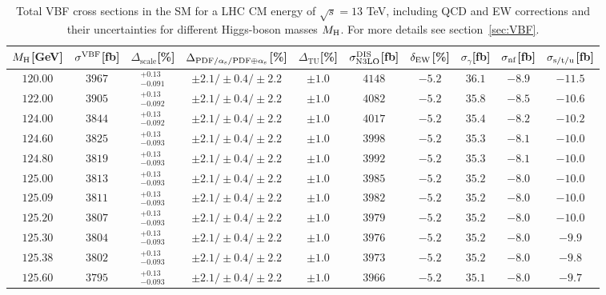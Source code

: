 \begin{table}[ht!]
\caption{Total VBF cross sections in the SM for a LHC CM energy of $\sqrt{s}=13$ TeV, including QCD and EW corrections
and their uncertainties for different Higgs-boson masses $M_\mathrm{H}$. For more details see section~\ref{sec:VBF}.}
\label{tab:vbf_XStot_13}
\begin{center}%
\begin{small}%
\begin{tabular}{cccccccc|cc}%
\toprule
$M_\mathrm{H}$[GeV] & $\sigma^{\mathrm{VBF}}$[fb] & $\Delta_{\mathrm{scale}}$[\%] & $\Delta_{\mathrm{PDF}/\alpha_{\mathrm{s}}/\mathrm{PDF\oplus\alpha_{\mathrm{s}}}}$[\%] & $\Delta_{\mathrm{TU}}$[\%] &
$\sigma_{\mathrm{N3LO}}^{\mathrm{DIS}}$[fb] & $\delta_{\mathrm{EW}}$[\%] & $\sigma_{\gamma}$[fb] & $\sigma_{\mbox{\scriptsize nf}}$[fb] & $\sigma_{\mbox{\scriptsize s/t/u}}$[fb]
\\
\midrule
$120.00$ & $3967$ & $^{+0.13}_{-0.091}$ & $\pm 2.1/\pm 0.4/\pm 2.2$ & $\pm 1.0$ & $4148$ & $-5.2$ & $36.1 $ & $-8.9$ & $-11.5$ \\
$122.00$ & $3905$ & $^{+0.13}_{-0.092}$ & $\pm 2.1/\pm 0.4/\pm 2.2$ & $\pm 1.0$ & $4082$ & $-5.2$ & $35.8 $ & $-8.5$ & $-10.6$ \\
$124.00$ & $3844$ & $^{+0.13}_{-0.092}$ & $\pm 2.1/\pm 0.4/\pm 2.2$ & $\pm 1.0$ & $4017$ & $-5.2$ & $35.4 $ & $-8.2$ & $-10.2$ \\
$124.60$ & $3825$ & $^{+0.13}_{-0.093}$ & $\pm 2.1/\pm 0.4/\pm 2.2$ & $\pm 1.0$ & $3998$ & $-5.2$ & $35.3 $ & $-8.1$ & $-10.0$ \\
$124.80$ & $3819$ & $^{+0.13}_{-0.093}$ & $\pm 2.1/\pm 0.4/\pm 2.2$ & $\pm 1.0$ & $3992$ & $-5.2$ & $35.3 $ & $-8.1$ & $-10.0$ \\
$125.00$ & $3813$ & $^{+0.13}_{-0.093}$ & $\pm 2.1/\pm 0.4/\pm 2.2$ & $\pm 1.0$ & $3985$ & $-5.2$ & $35.2 $ & $-8.0$ & $-10.0$ \\
$125.09$ & $3811$ & $^{+0.13}_{-0.093}$ & $\pm 2.1/\pm 0.4/\pm 2.2$ & $\pm 1.0$ & $3982$ & $-5.2$ & $35.2 $ & $-8.0$ & $-10.0$ \\
$125.20$ & $3807$ & $^{+0.13}_{-0.093}$ & $\pm 2.1/\pm 0.4/\pm 2.2$ & $\pm 1.0$ & $3979$ & $-5.2$ & $35.2 $ & $-8.0$ & $-10.0$ \\
$125.30$ & $3804$ & $^{+0.13}_{-0.093}$ & $\pm 2.1/\pm 0.4/\pm 2.2$ & $\pm 1.0$ & $3976$ & $-5.2$ & $35.2 $ & $-8.0$ & $-9.9 $ \\
$125.38$ & $3802$ & $^{+0.13}_{-0.093}$ & $\pm 2.1/\pm 0.4/\pm 2.2$ & $\pm 1.0$ & $3973$ & $-5.2$ & $35.2 $ & $-8.0$ & $-9.8 $ \\
$125.60$ & $3795$ & $^{+0.13}_{-0.093}$ & $\pm 2.1/\pm 0.4/\pm 2.2$ & $\pm 1.0$ & $3966$ & $-5.2$ & $35.1 $ & $-8.0$ & $-9.7 $ \\

\end{tabular}
\end{small}
\end{center}
\end{table}
